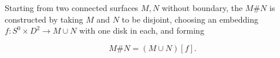 Starting from two connected surfaces $M, N$ without boundary, the  $M \# N$ is constructed by taking $M$ and $N$ to be disjoint, choosing an embedding $f: S^0 \times D^2 \to M \cup N$ with one disk in each, and forming

$$M \# N = (M \cup N)[f].$$
